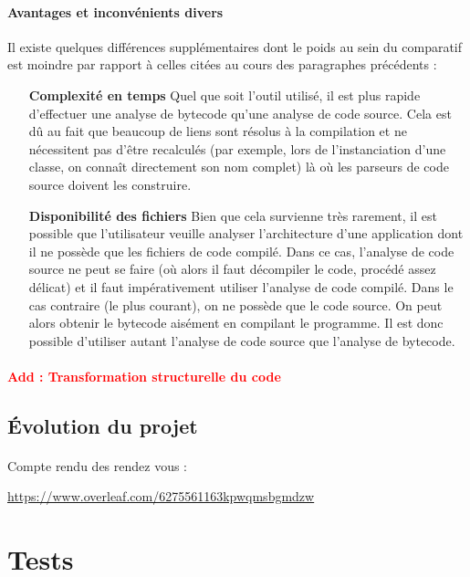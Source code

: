\documentclass{scrartcl}
\newcommand{\TODO}[1] {
    \noindent \paragraph{\textcolor{red}{#1}}
}
\begin{document}
        \paragraph{Avantages et inconvénients divers} Il existe quelques différences supplémentaires dont le poids au sein du comparatif est moindre par rapport à celles citées au cours des paragraphes précédents :
        \begin{itemize}
        	\item[\textbf{Complexité en temps}] Quel que soit l'outil utilisé, il est plus rapide d'effectuer une analyse de bytecode qu'une analyse de code source. Cela est dû au fait que beaucoup de liens sont résolus à la compilation et ne nécessitent pas d'être recalculés (par exemple, lors de l'instanciation d'une classe, on connaît directement son nom complet) là où les parseurs de code source doivent les construire.
        	\item[\textbf{Disponibilité des fichiers}] Bien que cela survienne très rarement, il est possible que l'utilisateur veuille analyser l'architecture d'une application dont il ne possède que les fichiers de code compilé. Dans ce cas, l'analyse de code source ne peut se faire (où alors il faut décompiler le code, procédé assez délicat) et il faut impérativement utiliser l'analyse de code compilé. Dans le cas contraire (le plus courant), on ne possède que le code source. On peut alors obtenir le bytecode aisément en compilant le programme. Il est donc possible d'utiliser autant l'analyse de code source que l'analyse de bytecode.
        \end{itemize}
        \TODO{Add : Transformation structurelle du code}
        
    \subsection{Évolution du projet}
        \paragraph{}Compte rendu des rendez vous :
        \begin{center}
            \url{https://www.overleaf.com/6275561163kpwqmsbgmdzw}
        \end{center}
        
    
    
    

\newpage
\section{Tests}
\end{document}

